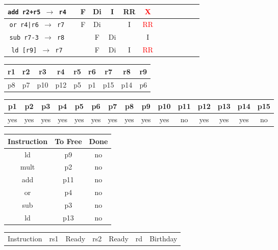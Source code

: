 \documentclass[12pt]{article}
\begin{document}
\begin{enumerate}
\begin{table}[H]
\begin{tabular}{|c|c|c|c|c|c|c|c|c|c|c|c|c|}
					\hline
					\texttt{add r2+r5 $\rightarrow$ r4} &  & F & Di & I & RR & \textcolor{red}{X} &  &  &  &  &  &\\
					\hline
					\texttt{or r4|r6 $\rightarrow$ r7} &  & F & Di &  & I & \textcolor{red}{RR} &  &  &  &  &  &\\
					\hline
					\texttt{sub r7-3 $\rightarrow$ r8} &  &  & F & Di &  & I &  &  &  &  &  &\\
					\hline
					\texttt{ld [r9] $\rightarrow$ r7} &  &  & F & Di & I & \textcolor{red}{RR} &  &  &  &  &  &\\
					\hline 
				\end{tabular}
			\end{table}
			\begin{table}[H]
				\begin{tabular}{|c|c|c|c|c|c|c|c|c|}
					\hline
					r1 & r2 & r3 & r4 & r5 & r6 & r7 & r8 & r9\\
					\hline
					p8 & p7 & p10 & p12 & p5 & p1 & p15 & p14 & p6\\
					\hline
				\end{tabular}
			\end{table}
			\begin{table}[H]
				\begin{tabular}{|c|c|c|c|c|c|c|c|c|c|c|c|c|c|c|}
					\hline
					p1 & p2 & p3 & p4 & p5 & p6 & p7 & p8 & p9 & p10 & p11 & p12 & p13 & p14 & p15\\
					\hline
					yes & yes & yes & yes & yes & yes & yes & yes & yes & yes & no & yes & yes & yes & no\\
					\hline
				\end{tabular}
			\end{table}
			\begin{table}[H]
				\begin{tabular}{|c|c|c|}
					\hline
					Instruction & To Free & Done\\
					\hline
					ld & p9 & no\\
					\hline
					mult & p2 & no\\
					\hline
					add & p11 & no\\
					\hline
					or & p4 & no\\
					\hline
					sub & p3 & no\\
					\hline
					ld & p13 & no\\
					\hline
				\end{tabular}
				\hfill
				\begin{tabular}{|c|c|c|c|c|c|c|}
					\hline
					Instruction & rs1 & Ready & rs2 & Ready & rd & Birthday\\

\end{tabular}
\end{table}
\end{enumerate}
\end{document}
